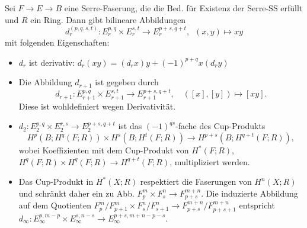 \documentclass{cheat-sheet}
\begin{document}
\begin{lem}
  Sei $F \!\to\! E \!\to\! B$ eine Serre-Faserung, die die Bed. für Existenz der Serre-SS erfüllt und  $R$ ein Ring.
  Dann gibt bilineare Abbildungen
  \[ d^{(p,q,s,t)}_r : E^{p,q}_r \times E^{s,t}_r \to E^{p+s,q+t}_r, \enspace (x, y) \mapsto xy \]
  mit folgenden Eigenschaften:
  \begin{itemize}
    \item $d_r$ ist derivativ: $d_r(xy) = (d_r x) y + (-1)^{p+q} x (d_r y)$
    \item Die Abbildung $d_{r+1}$ ist gegeben durch
    \[
      d_{r+1} : E^{p,q}_{r+1} \times E^{s,t}_{r+1} \to E^{p+s,q+t}_{r+1}, \quad
      ([x], [y]) \mapsto [xy].
    \]
    Diese ist wohldefiniert wegen Derivativität.
    \item $d_2 : E_2^{p,q} \!\times\! E_2^{r,s} \!\to\! E_2^{p+s,q+t}$ ist das $(-1)^{qs}$-fache des Cup-Produkts
    \[ H^p(B; H^q(F; R)) \times H^s(B; H^t(F; R)) \to H^{p+s}(B; H^{q+t}(F; R)), \]
    wobei Koeffizienten mit dem Cup-Produkt von $H^*(F; R)$, $H^q(F; R) \times H^q(F; R) \to H^{q+t}(F; R)$, multipliziert werden.
    \item Das Cup-Produkt in $H^*(X; R)$ respektiert die Faserungen von $H^n(X; R)$ und schränkt daher ein zu Abb. $F_p^m \times F_s^n \to F_{p+s}^{m+n}$.
    Die induzierte Abbildung auf dem Quotienten $F^m_p/F^m_{p+1} \times F^n_s/F^n_{s+1} \to F^{m+n}_{p+s} / F^{m+n}_{p+s+1}$ entspricht $d_\infty : E_\infty^{p,m-p} \times E_\infty^{s,n-s} \to E_\infty^{p+s,m+n-p-s}$.
  \end{itemize}
\end{lem}

\end{document}
